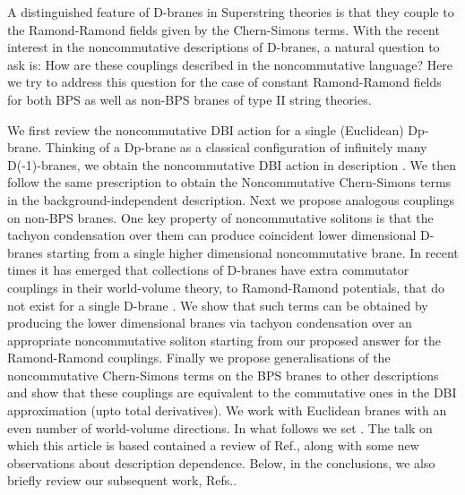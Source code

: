 \documentclass[a4paper,a4paper]{amsproc}
\theoremstyle{definition}
\theoremstyle{remark}
\numberwithin{equation}{section}
\begin{document}
A distinguished feature of D-branes in Superstring theories is that
they couple to the Ramond-Ramond fields given by the Chern-Simons
terms. With the recent interest in the noncommutative descriptions of
D-branes, a natural question to ask is: How are these couplings
described in the noncommutative language? Here we try to address this
question for the case of constant Ramond-Ramond fields for both BPS as
well as non-BPS branes of type II string theories.

We first review the noncommutative DBI action for a single (Euclidean)
Dp-brane. Thinking of a Dp-brane as a classical configuration of
infinitely many D(-1)-branes, we obtain the noncommutative DBI action
in \coordHE{} description \cite{cornalba, seibnew}. We then follow
the same prescription to obtain the Noncommutative Chern-Simons terms
in the background-independent \coordHE{} description. Next we propose
analogous couplings on non-BPS branes. One key property of
noncommutative solitons is that the tachyon condensation over them can
produce \coordHE{} coincident lower dimensional D-branes starting from a
single higher dimensional noncommutative brane. In recent times it has
emerged that collections of \coordHE{} D-branes have extra commutator
couplings in their world-volume theory, to Ramond-Ramond potentials,
that do not exist for a single D-brane \cite{myers, twosens}. We show
that such terms can be obtained by producing the lower dimensional
branes via tachyon condensation over an appropriate noncommutative
soliton starting from our proposed answer for the Ramond-Ramond
couplings. Finally we propose generalisations of the noncommutative
Chern-Simons terms on the BPS branes to other descriptions and show
that these couplings are equivalent to the commutative ones in the DBI
approximation (upto total derivatives). We work with Euclidean branes
with an even number of world-volume directions. In what follows we set
\coordHE{}. The talk on which this article is
based\cite{talklink} contained a
review of Ref.\cite{nccs}, along with some new observations about
description dependence. Below, in the conclusions, we also briefly
review our subsequent work, Refs.\cite{smnvstwo, sdsmnvs}.

\end{document}
